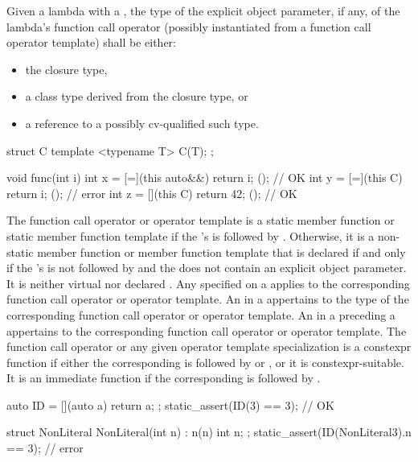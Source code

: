 \pnum
Given a lambda with a ,
the type of the explicit object parameter, if any,
of the lambda's function call operator
(possibly instantiated from a function call operator template)
shall be either:
\begin{itemize}
\item
the closure type,
\item
a class type derived from the closure type, or
\item
a reference to a possibly cv-qualified such type.
\end{itemize}
\begin{example}
\begin{codeblock}
struct C {
  template <typename T>
  C(T);
};

void func(int i) {
  int x = [=](this auto&&) { return i; }();     // OK
  int y = [=](this C) { return i; }();          // error
  int z = [](this C) { return 42; }();          // OK
}
\end{codeblock}
\end{example}

\pnum
The function call operator or operator template is
a static member function or static member function template
if the 's
 is followed by .
Otherwise, it is
a non-static member function or member function template
that is declared
 if and only if the
's  is not
followed by  and
the  does not contain
an explicit object parameter.
It is neither virtual nor declared . Any
 specified on a 
applies to the corresponding function call operator or operator template.
An  in a  appertains
to the type of the corresponding function call operator or operator template.
An  in a 
preceding a 
appertains to the corresponding function call operator or operator template.
The function call operator or any given operator template specialization
is a constexpr function if either
the corresponding 
is followed by  or , or
it is constexpr-suitable.
It is an immediate function
if the corresponding 
 is followed by .
\begin{example}
\begin{codeblock}
auto ID = [](auto a) { return a; };
static_assert(ID(3) == 3);                      // OK

struct NonLiteral {
  NonLiteral(int n) : n(n) { }
  int n;
};
static_assert(ID(NonLiteral{3}).n == 3);        // error
\end{codeblock}
\end{example}

